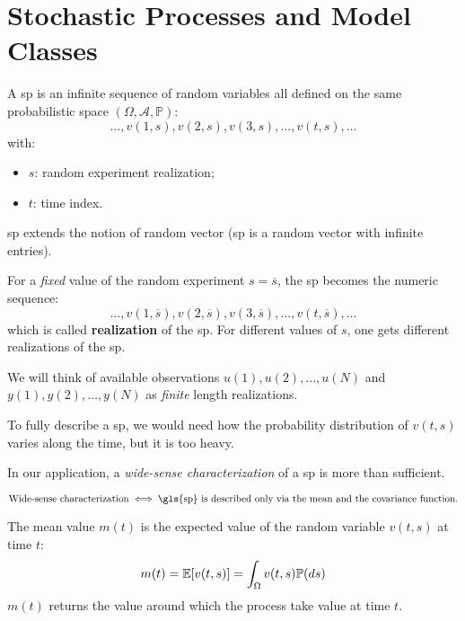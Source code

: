\chapter{Stochastic Processes and Model Classes}
A \gls{sp} is an infinite sequence of random variables all defined on the same probabilistic space $(\Omega,\mathcal{A},\mathbb{P})$:
\[
	\ldots,v(1,s),v(2,s),v(3,s),\ldots,v(t,s),\ldots
\]
with:
\begin{itemize}
 	\item $s$: random experiment realization;
 	\item $t$: time index.
 \end{itemize}

\begin{rem}
	\gls{sp} extends the notion of random vector (\gls{sp} is a random vector with infinite entries).
\end{rem}

\begin{rem}
For a \emph{fixed} value of the random experiment $s = \overline{s}$, the \gls{sp} becomes the numeric sequence:
\[
	\ldots,v(1,\overline{s}),v(2,\overline{s}),v(3,\overline{s}),\ldots,v(t,\overline{s}),\ldots
\]
which is called \textbf{realization} of the \gls{sp}.
For different values of $s$, one gets different realizations of the \gls{sp}.
\end{rem}

We will think of available observations ${u(1),u(2),\ldots,u(N)}$ and ${y(1), y(2),\ldots, y(N)}$ as \emph{finite} length realizations.

To fully describe a \gls{sp}, we would need how the probability distribution of $v(t,s)$ varies along the time, but it is too heavy.

In our application, a \emph{wide-sense characterization} of a \gls{sp} is more than sufficient.

\begin{defn}
\[
\text{Wide-sense characterization}\iff\text{\gls{sp} is described only via the mean and the covariance function.}
\]
\end{defn}

\begin{defn}
	The mean value $m(t)$ is the expected value of the random variable $v(t,s)$ at time $t$:
	\[
		m(t)=\mathbb{E}[v(t, s)]=\int_{\Omega} v(t, s) \mathbb{P}(ds)
	\]
	$m(t)$ returns the value around which the process take value at time $t$.
\end{defn}

